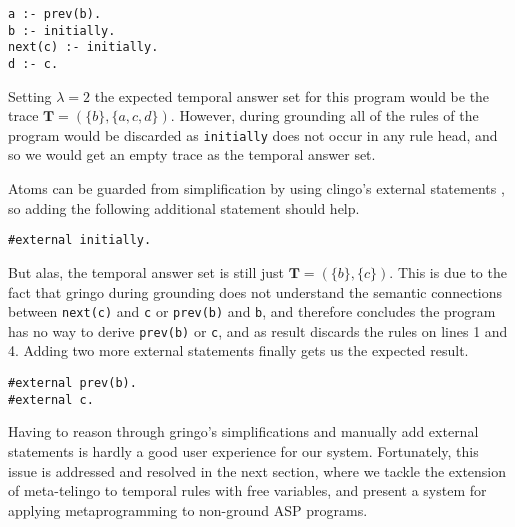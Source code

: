 \begin{lstlisting}[language=clingo]
a :- prev(b).
b :- initially.
next(c) :- initially.
d :- c.
\end{lstlisting}

Setting $\lambda=2$ the expected temporal answer set for this program
would be the trace $\bm{T}=(\{ b \},\{ a, c, d \})$. However, during
grounding all of the rules of the program would be discarded as
\verb|initially| does not occur in any rule head, and so we would get
an empty trace as the temporal answer set.

Atoms can be guarded from simplification by using clingo's external
statements \cite{PotasscoUserGuide19}, so adding the following
additional statement should help.

\begin{lstlisting}[language=clingo,numbers=none]
#external initially.
\end{lstlisting}

But alas, the temporal answer set is still just
$\bm{T}=(\{ b \},\{ c \})$. This is due to the fact that gringo during
grounding does not understand the semantic connections between
\verb|next(c)| and \verb|c| or \verb|prev(b)| and \verb|b|, and
therefore concludes the program has no way to derive \verb|prev(b)| or
\verb|c|, and as result discards the rules on lines 1 and 4. Adding
two more external statements finally gets us the expected result.

\begin{lstlisting}[language=clingo,numbers=none]
#external prev(b).
#external c.
\end{lstlisting}

Having to reason through gringo's simplifications and manually add
external statements is hardly a good user experience for our
system. Fortunately, this issue is addressed and resolved in the next
section, where we tackle the extension of meta-telingo to temporal rules with
free variables, and present a system for applying metaprogramming to
non-ground ASP programs.
